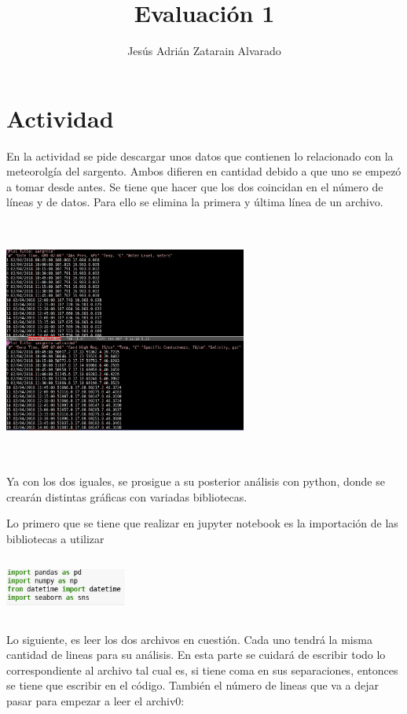 \documentclass{article}
\title{Evaluación 1}
\author{Jesús Adrián Zatarain Alvarado}
\begin{document}
\maketitle
\section{Actividad}

En la actividad se pide descargar unos datos que contienen lo relacionado con la meteorolgía del sargento. Ambos difieren en cantidad debido a que uno se empezó a tomar desde antes. Se tiene que hacer que los dos coincidan en  el número de líneas y de datos. Para ello se elimina la primera y última línea de un archivo.

\begin{center}
\includegraphics[width=8cm, height=8cm]{archivo.png}
\end{center}

Ya con los dos iguales, se prosigue a su posterior análisis con python, donde se crearán distintas gráficas con variadas bibliotecas.

Lo primero que se tiene que realizar en jupyter notebook es la importación de las bibliotecas a utilizar

\begin{center}
\includegraphics[width=4cm, height=2cm]{inicio.png}
\end{center}

Lo siguiente, es leer los dos archivos en cuestión. Cada uno tendrá la misma cantidad de lineas para su análisis. En esta parte se cuidará de escribir todo lo correspondiente al archivo tal cual es, si tiene coma en sus separaciones, entonces se tiene que escribir en el código. También el número de lineas que va a dejar pasar para empezar a leer el archiv0:
\end{document}
